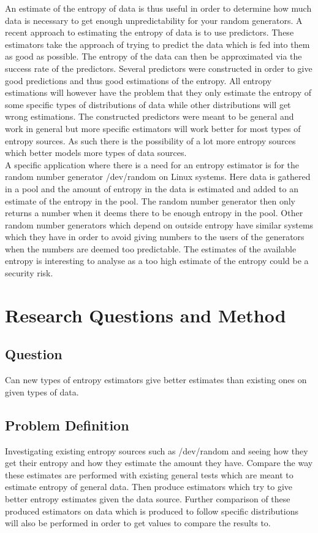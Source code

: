\documentclass[a4paper,11pt]{report}
\begin{document}
\noindent
An estimate of the entropy of data is thus useful in order to determine
how much data is necessary to get enough unpredictability for your random
generators. A recent approach to estimating the entropy of data is to use 
predictors. These estimators take the approach of trying to predict the data
which is fed into them as good as possible. The entropy of the data can then
be approximated via the success rate of the predictors. Several predictors were
constructed in order to give good predictions and thus good estimations of the 
entropy. All entropy estimations will however have the problem that they only
estimate the entropy of some specific types of distributions of data while 
other distributions will get wrong estimations. The constructed predictors were 
meant to be general and work in general but more specific estimators will work
better for most types of entropy sources. As such there is the possibility of
a lot more entropy sources which better models more types of data sources. \\

\noindent
A specific application where there is a need for an entropy estimator is for
the random number generator /dev/random on Linux systems. Here data is 
gathered in a pool and the amount of entropy in the data is estimated 
and added to an estimate of the entropy in the pool\cite{/dev/random}.
The random number 
generator then only returns a number when it deems there to be enough entropy
in the pool. Other random number generators which depend on outside entropy 
have similar systems which they have in order to avoid giving numbers to 
the users of the generators when the numbers are deemed too predictable.
The estimates of the available entropy is interesting to analyse as a 
too high estimate of the entropy could be a security risk.
\section*{Research Questions and Method}
\subsection*{Question}
Can new types of entropy estimators give better estimates than existing
ones on given types of data.
\subsection*{Problem Definition}
Investigating existing entropy sources such as /dev/random and seeing how
they get their entropy and how they estimate the amount they have. Compare the
way these estimates are performed with existing general tests which are meant 
to estimate entropy of general data. Then produce estimators which try to give
better entropy estimates given the data source.
Further comparison of these produced estimators on data which is produced
to follow specific distributions will also be performed in order to get 
values to compare the results to.
\end{document}
